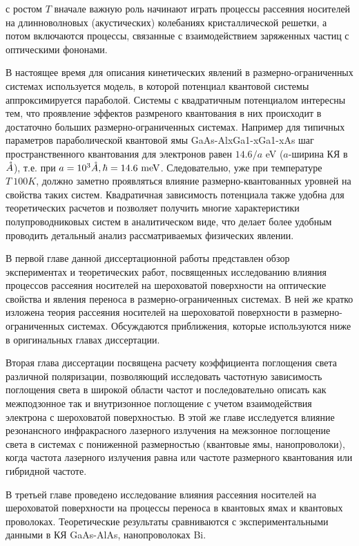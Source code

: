 с ростом $T$ вначале важную роль начинают играть процессы рассеяния носителей на длинноволновых (акустических) колебаниях кристаллической решетки, а потом включаются процессы, связанные с взаимодействием заряженных частиц с оптическими фононами.

В настоящее время для описания кинетических явлений в размерно-ограниченных системах используется модель, в которой потенциал квантовой системы аппроксимируется параболой. Системы с квадратичным потенциалом интересны тем, что проявление эффектов размреного квантования в них происходит в достаточно больших размерно-ограниченных системах. Например для типичных параметров параболической квантовой ямы GaAs-AlxGa1-xGa1-xAs шаг пространственного квантования для электронов равен $14.6/a$ eV ($a$-ширина КЯ в $\AA$), т.е. при $a=10^3 \AA, \hbar = 14.6 \text{ meV}$. Следовательно, уже при температуре $T~100 K$, должно заметно проявляться влияние размерно-квантованных уровней на свойства таких систем. Квадратичная зависимость потенциала также удобна для теоретических расчетов и позволяет получить многие характеристики полупроводниковых систем в аналитическом виде, что делает более удобным проводить детальный анализ рассматриваемых физических явлении.

В первой главе данной диссертационной работы представлен обзор экспериментах и теоретических работ, посвященных исследованию влияния процессов рассеяния носителей на шероховатой поверхности на оптические свойства и явления переноса в размерно-ограниченных системах. В ней же кратко изложена теория рассеяния носителей на шероховатой поверхности в размерно-ограниченных системах. Обсуждаются приближения, которые используются ниже в оригинальных главах диссертации.

Вторая глава диссертации посвящена расчету коэффициента поглощения света различной поляризации, позволяющий исследовать частотную зависимость поглощения света в широкой области частот и последовательно описать как межподзонное так и внутризонное поглощение с учетом взаимодействия электрона с шероховатой поверхностью.
В этой же главе исследуется влияние резонансного инфракрасного лазерного излучения на межзонное поглощение света в системах с пониженной размерностью (квантовые ямы, нанопроволоки), когда частота лазерного излучения равна или частоте размерного квантования или гибридной частоте.

В третьей главе проведено исследование влияния рассеяния носителей на шероховатой поверхности на процессы переноса в квантовых ямах и квантовых проволоках. Теоретические результаты сравниваются с экспериментальными данными в КЯ GaAs-AlAs, нанопроволоках Bi.

